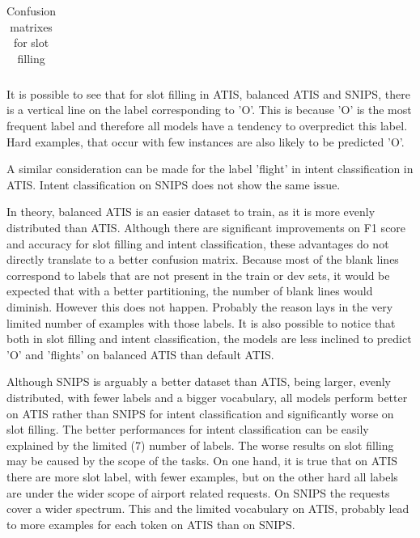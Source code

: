 \documentclass[a4paper]{article}
\begin{document}
\begin{table}[h]
\begin{adjustbox}{max width=\textwidth}
\begin{tabular}{l|ccc}
		\end{tabular}
	\end{adjustbox}

\caption{Confusion matrixes for slot filling}
\label{fig:cm_slot}
\end{table}

It is possible to see that for slot filling in ATIS, balanced ATIS and SNIPS, there is a vertical line on the label corresponding to 'O'. This is because 'O' is the most frequent label and therefore all models have a tendency to overpredict this label. Hard examples, that occur with few instances are also likely to be predicted 'O'. 

A similar consideration can be made for the label 'flight' in intent classification in ATIS. Intent classification on SNIPS does not show the same issue. 

In theory, balanced ATIS is an easier dataset to train, as it is more evenly distributed than ATIS. Although there are significant improvements on F1 score and accuracy for slot filling and intent classification, these advantages do not directly translate to a better confusion matrix. Because most of the blank lines correspond to labels that are not present in the train or dev sets, it would be expected that with a better partitioning, the number of blank lines would diminish. However this does not happen. Probably the reason lays in the very limited number of examples with those labels. 
It is also possible to notice that both in slot filling and intent classification, the models are less inclined to predict 'O' and 'flights' on balanced ATIS than default ATIS.

Although SNIPS is arguably a better dataset than ATIS, being larger, evenly distributed, with fewer labels and a bigger vocabulary, all models perform better on ATIS rather than SNIPS for intent classification and significantly worse on slot filling. The better performances for intent classification can be easily explained by the limited (7) number of labels. The worse results on slot filling may be caused by the scope of the tasks. 
On one hand, it is true that on ATIS there are more slot label, with fewer examples, but on the other hard all labels are under the wider scope of airport related requests. On SNIPS the requests cover a wider spectrum. This and the limited vocabulary on ATIS, probably lead to more examples for each token on ATIS than on SNIPS.
\end{document}
